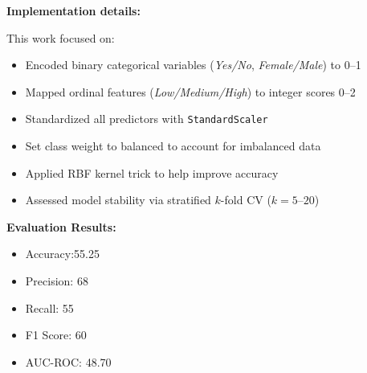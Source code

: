 \documentclass[11pt,a4paper]{article}
\begin{document}
\begin{tcolorbox}[
        title=Visualization and Model Evaluation,
        colback=mediumblue!30,
        colframe=darkblue,
        boxrule=0.5pt,
        fonttitle=\bfseries\sffamily\footnotesize,
        fontupper=\footnotesize
    ]
    \textbf{Implementation details:}

    This work focused on:
    \begin{itemize}[leftmargin=*, itemsep=2pt, parsep=0pt]
    Implementation details
        \item Encoded binary categorical variables (\textit{Yes/No}, \textit{Female/Male}) to  \numrange{0}{1}
        \item Mapped ordinal features (\textit{Low/Medium/High}) to integer scores \numrange{0}{2}
        \item Standardized all predictors with \texttt{StandardScaler}
        \item Set class weight to balanced to account for imbalanced data
        \item Applied RBF kernel trick to help improve accuracy
        \item Assessed model stability via stratified $k$-fold CV ($k\!=\!5\text{–}20$)
    \end{itemize}

    \textbf{Evaluation Results:}
    \begin{itemize}[leftmargin=*, itemsep=2pt, parsep=0pt]
        \item Accuracy:55.25%
        \item Precision: 68%
        \item Recall: 55%
        \item F1 Score: 60%
        \item AUC-ROC: 48.70
    \end{itemize}
\end{tcolorbox}
\end{document}
